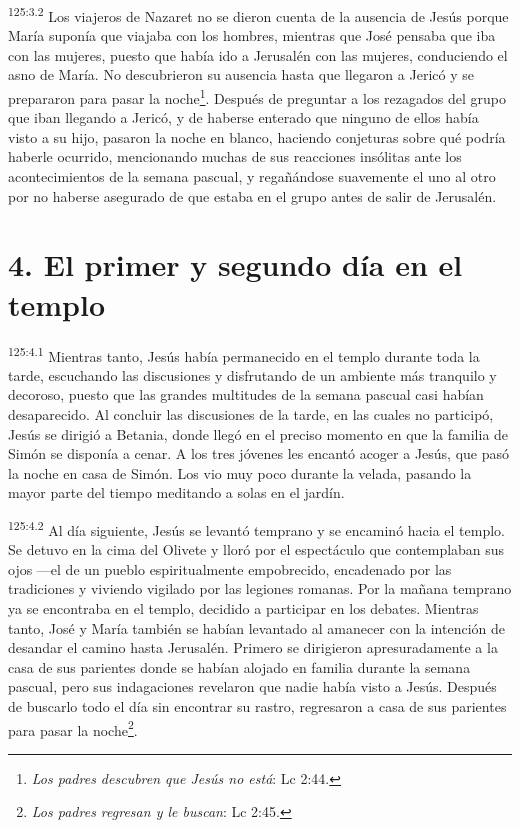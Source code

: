 \par
\textsuperscript{125:3.2} Los viajeros de Nazaret no se dieron cuenta de la ausencia de Jesús porque María suponía que viajaba con los hombres, mientras que José pensaba que iba con las mujeres, puesto que había ido a Jerusalén con las mujeres, conduciendo el asno de María. No descubrieron su ausencia hasta que llegaron a Jericó y se prepararon para pasar la noche\footnote{\textit{Los padres descubren que Jesús no está}: Lc 2:44.}. Después de preguntar a los rezagados del grupo que iban llegando a Jericó, y de haberse enterado que ninguno de ellos había visto a su hijo, pasaron la noche en blanco, haciendo conjeturas sobre qué podría haberle ocurrido, mencionando muchas de sus reacciones insólitas ante los acontecimientos de la semana pascual, y regañándose suavemente el uno al otro por no haberse asegurado de que estaba en el grupo antes de salir de Jerusalén.

\section*{4. El primer y segundo día en el templo}
\par
\textsuperscript{125:4.1} Mientras tanto, Jesús había permanecido en el templo durante toda la tarde, escuchando las discusiones y disfrutando de un ambiente más tranquilo y decoroso, puesto que las grandes multitudes de la semana pascual casi habían desaparecido. Al concluir las discusiones de la tarde, en las cuales no participó, Jesús se dirigió a Betania, donde llegó en el preciso momento en que la familia de Simón se disponía a cenar. A los tres jóvenes les encantó acoger a Jesús, que pasó la noche en casa de Simón. Los vio muy poco durante la velada, pasando la mayor parte del tiempo meditando a solas en el jardín.

\par
\textsuperscript{125:4.2} Al día siguiente, Jesús se levantó temprano y se encaminó hacia el templo. Se detuvo en la cima del Olivete y lloró por el espectáculo que contemplaban sus ojos ---el de un pueblo espiritualmente empobrecido, encadenado por las tradiciones y viviendo vigilado por las legiones romanas. Por la mañana temprano ya se encontraba en el templo, decidido a participar en los debates. Mientras tanto, José y María también se habían levantado al amanecer con la intención de desandar el camino hasta Jerusalén. Primero se dirigieron apresuradamente a la casa de sus parientes donde se habían alojado en familia durante la semana pascual, pero sus indagaciones revelaron que nadie había visto a Jesús. Después de buscarlo todo el día sin encontrar su rastro, regresaron a casa de sus parientes para pasar la noche\footnote{\textit{Los padres regresan y le buscan}: Lc 2:45.}.

